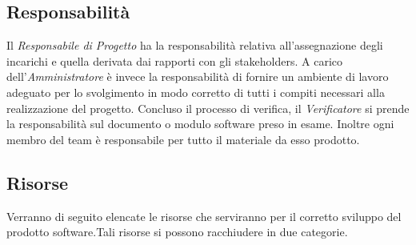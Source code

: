 \subsection{Responsabilità}
Il \textit{Responsabile di Progetto} ha la responsabilità relativa all’assegnazione degli incarichi e quella derivata dai rapporti con gli stakeholders. A carico dell’\textit{Amministratore} è invece la responsabilità di fornire un ambiente di lavoro adeguato per lo svolgimento in modo corretto di tutti i compiti necessari alla realizzazione del progetto. Concluso il processo di verifica, il \textit{Verificatore} si prende la responsabilità sul documento o modulo software preso in esame. Inoltre ogni membro del team è responsabile per tutto il materiale da esso prodotto.


\subsection{Risorse}
Verranno di seguito elencate le risorse che serviranno per il corretto sviluppo del prodotto software.Tali risorse si possono racchiudere in due categorie.

